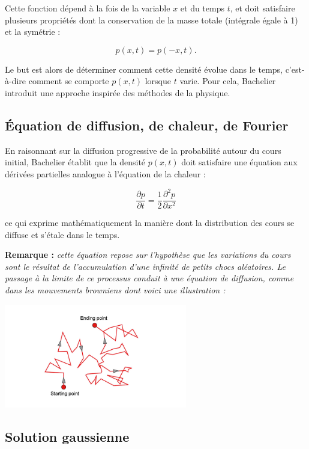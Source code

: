 \documentclass[12pt,a4paper]{article}
\begin{document}
Cette fonction dépend à la fois de la variable \( x \) et du temps \( t \), et doit satisfaire plusieurs propriétés dont la conservation de la masse totale (intégrale égale à 1) et la symétrie :

\[
p(x,t) = p(-x,t).
\]

Le but est alors de déterminer comment cette densité évolue dans le temps, c’est-à-dire comment se comporte $p(x,t)$ lorsque $t$ varie. Pour cela, Bachelier introduit une approche inspirée des méthodes de la physique.

\subsection{Équation de diffusion, de chaleur, de Fourier}

En raisonnant sur la diffusion progressive de la probabilité autour du cours initial, Bachelier établit que la densité $p(x,t)$ doit satisfaire une équation aux dérivées partielles analogue à l’équation de la chaleur :

\[
\frac{\partial p}{\partial t} = \frac{1}{2} \frac{\partial^2 p}{\partial x^2}
\]

\noindent ce qui exprime mathématiquement la manière dont la distribution des cours se diffuse et s’étale dans le temps.

\medskip 

\noindent \textbf{Remarque : } \textit{ cette équation repose sur l’hypothèse que les variations du cours sont le résultat de l’accumulation d’une infinité de petits chocs aléatoires. Le passage à la limite de ce processus conduit à une équation de diffusion, comme dans les mouvements browniens dont voici une illustration :}

\begin{center}
  \includegraphics[width=0.6\textwidth]{brownian_motion.png}
\end{center}

\subsection{Solution gaussienne}
\end{document}
